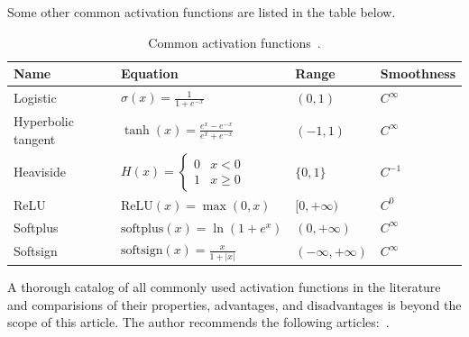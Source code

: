 \documentclass[12pt]{report}
\theoremstyle{definition}
\theoremstyle{remark}
\begin{document}
Some other common activation functions are listed in the table below.
\begin{table}[h]
    \centering
    \caption{Common activation functions~\cite{apicella_survey_2021, nwankpa_activation_2018, dubey_activation_2022}.}
    \begin{tabular}{|l|l|l|l|}
        \hline
        \textbf{Name} & \textbf{Equation} & \textbf{Range} & \textbf{Smoothness} \\ \hline
        Logistic & $\sigma(x) = \frac{1}{1+e^{-x}}$ & $(0, 1)$ &$C^\infty$ \\
        Hyperbolic tangent & $\tanh(x) = \frac{e^x - e^{-x}}{e^x + e^{-x}}$ & $(-1,1)$ & $C^\infty$ \\
        Heaviside & $H(x) = \begin{cases}
            0 & x < 0 \\
            1 & x \geq 0
        \end{cases}$ & $\{0, 1\}$ & $C^{-1}$ \\
        ReLU & $\text{ReLU}(x) = \max(0,x)$ & $[0, +\infty)$ & $C^0$ \\
        Softplus & $\text{softplus}(x) = \ln(1+e^x)$ & $(0, +\infty)$ & $C^\infty$ \\
        Softsign & $\text{softsign}(x) = \frac{x}{1+|x|}$ & $(-\infty, +\infty)$ & $C^\infty$ \\
        \hline
    \end{tabular}
\end{table}

A thorough catalog of all commonly used activation functions in the literature and comparisions of their properties, advantages, and disadvantages is beyond the scope of this article. The author recommends the following articles:~\cite{apicella_survey_2021, dubey_activation_2022}.
\end{document}
